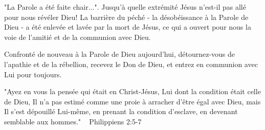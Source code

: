 "La Parole a été faite chair...". Jusqu'à quelle extrémité Jésus n'est-il pas allé pour nous révéler Dieu! La barrière du péché - la désobéissance à la Parole de Dieu - a été enlevée et lavée par la mort de Jésus, ce qui a ouvert pour nous la voie de l'amitié et de la communion avec Dieu.

Confronté de nouveau à la Parole de Dieu aujourd'hui, détournez-vous de l'apathie et de la rébellion, recevez le Don de Dieu, et entrez en communion avec Lui pour toujours.


"Ayez en vous la pensée qui était en Christ-Jésus, Lui dont la condition était celle de Dieu, Il n'a pas estimé comme une proie à arracher d'être égal avec Dieu, mais Il s'est dépouillé Lui-même, en prenant la condition d'esclave, en devenant semblable aux hommes." ~ Philippiens 2:5-7 


